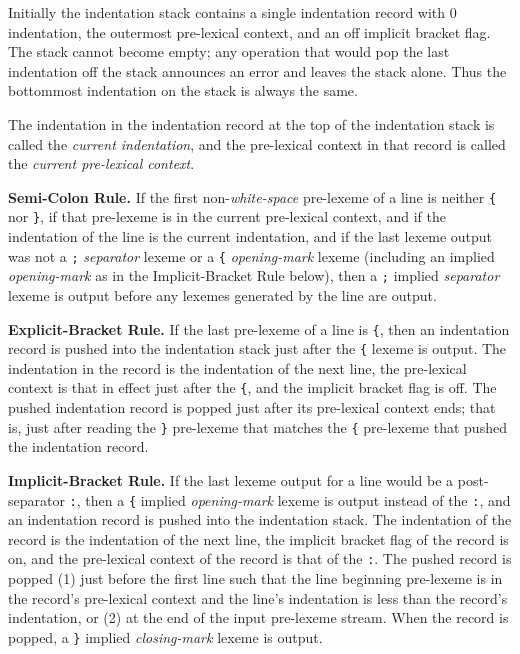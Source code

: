 \documentclass[12pt]{article}
\newcommand{\key}[1]{{\em #1}\index{#1}}
\begin{document}
Initially the indentation stack contains a single indentation record with
0 indentation, the outermost pre-lexical context,
and an off implicit bracket flag.
The stack cannot become empty; any operation that would
pop the last indentation off the stack announces an error and leaves the
stack alone.  Thus the bottommost indentation on the stack is always
the same.

The indentation in the indentation record at the top of the indentation
stack is called the \key{current indentation}, and the pre-lexical
context in that record is called the \key{current pre-lexical context}.

{\bf Semi-Colon Rule.}
If the first non-{\em white-space} pre-lexeme of a line is neither
\verb|{| nor \verb|}|, if that pre-lexeme is in
the current pre-lexical context, and if the indentation of the line
is the current indentation, and if the last lexeme output was not
a \verb|;| {\em separator} lexeme or a \verb|{| {\em opening-mark}
lexeme (including an implied {\em opening-mark} as in the
Implicit-Bracket Rule below), then a \verb|;| implied {\em separator}
lexeme is output
before any lexemes generated by the line are output.

{\bf Explicit-Bracket Rule.}
If the last pre-lexeme of a line is \verb|{|, then an indentation record
is pushed into the indentation stack just after the \verb|{| lexeme
is output.  The indentation in the record is the indentation of the next
line, the pre-lexical context is that in effect just after the \verb|{|,
and the implicit bracket flag is off.
The pushed indentation record is popped just after its pre-lexical context
ends; that is, just after reading the \verb|}| pre-lexeme that matches the
\verb|{| pre-lexeme that pushed the indentation record.

{\bf Implicit-Bracket Rule.}
If the last lexeme output for a line would be a post-separator \verb|:|,
then a \verb|{| implied {\em opening-mark} lexeme
is output instead of the \verb|:|, and an indentation
record is pushed into the indentation stack.  The indentation of the
record is the indentation of the next line, the implicit bracket flag
of the record is on, and the
pre-lexical context of the record is that of the \verb|:|.
The pushed record is popped (1) just before the first line such that
the line beginning pre-lexeme is in the record's pre-lexical context
and the line's indentation is less than the record's indentation,
or (2) at the end of the input pre-lexeme stream.
When the record is popped, a \verb|}| implied {\em closing-mark}
lexeme is output.
\end{document}
